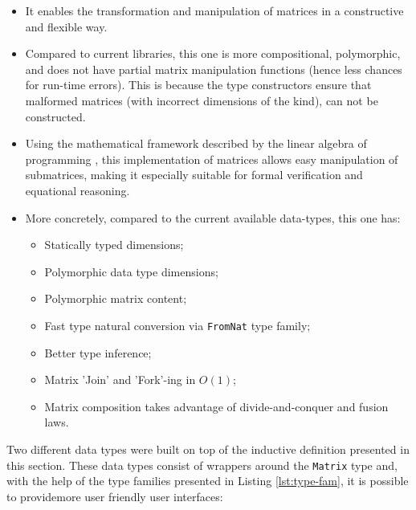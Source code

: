 \documentclass[
  oneside,
  11pt, a4paper,
  footinclude=true,
  headinclude=true,
  cleardoublepage=empty
]{scrbook}
\theoremstyle{definition}
\theoremstyle{definition}
\begin{document}
        \begin{itemize}
            \item It enables the transformation and manipulation of matrices in a constructive and flexible way.
            \item Compared to current libraries, this one is more compositional, polymorphic, and does not have partial matrix manipulation functions (hence less chances for run-time errors). This is because the type constructors ensure that malformed matrices (with incorrect dimensions of the kind), can not be constructed.
            \item Using the mathematical framework described by the linear algebra of programming \citep{oliveira2012towards}, this implementation of matrices allows easy manipulation of submatrices, making it especially suitable for formal verification and equational reasoning.
            \item More concretely, compared to the current available data-types, this one has:
                  \begin{itemize}
                    \item Statically typed dimensions;
                    \item Polymorphic data type dimensions;
                    \item Polymorphic matrix content;
                    \item Fast type natural conversion via \texttt{FromNat} type family;
                    \item Better type inference;
                    \item Matrix 'Join' and 'Fork'-ing in $O(1)$;
                    \item Matrix composition takes advantage of divide-and-conquer and fusion laws.
                  \end{itemize}
        \end{itemize}
        
        
        Two different data types were built on top of the inductive definition presented in this section. These data types consist of wrappers around the \texttt{Matrix} type and, with the help of the type families presented in Listing \ref{lst:type-fam}, it is possible to providemore user friendly user interfaces:
        
\end{document}
